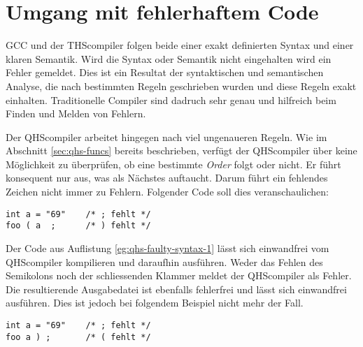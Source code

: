 \section{Umgang mit fehlerhaftem Code}
GCC und der THScompiler folgen beide einer exakt definierten Syntax und einer klaren Semantik.
Wird die Syntax oder Semantik nicht eingehalten wird ein Fehler gemeldet.
Dies ist ein Resultat der syntaktischen und semantischen Analyse, die nach bestimmten Regeln geschrieben wurden und diese Regeln exakt einhalten.
Traditionelle Compiler sind dadruch sehr genau und hilfreich beim Finden und Melden von Fehlern.

Der QHScompiler arbeitet hingegen nach viel ungenaueren Regeln.
Wie im Abschnitt \ref{sec:qhs-funcs} bereits beschrieben, verfügt der QHScompiler über keine Möglichkeit zu überprüfen, ob eine bestimmte \textit{Order} folgt oder nicht.
Er führt konsequent nur aus, was als Nächstes auftaucht. Darum führt ein fehlendes Zeichen nicht immer zu Fehlern.
Folgender Code soll dies veranschaulichen:

\begin{lstlisting}[language=QHS, caption=QHS mit fehlenden \textit{Tokens}, label=eg:qhs-faulty-syntax-1]
int a = "69"    /* ; fehlt */
foo ( a  ;      /* ) fehlt */
\end{lstlisting}

Der Code aus Auflistung \ref{eg:qhs-faulty-syntax-1} lässt sich einwandfrei vom QHScompiler kompilieren und daraufhin ausführen.
Weder das Fehlen des Semikolons noch der schliessenden Klammer meldet der QHScompiler als Fehler.
Die resultierende Ausgabedatei ist ebenfalls fehlerfrei und lässt sich einwandfrei ausführen. 
Dies ist jedoch bei folgendem Beispiel nicht mehr der Fall.

\begin{lstlisting}[language=QHS, caption=QHS mit fehlender öffnender Klammer, label=eg:qhs-faulty-syntax-2]
int a = "69"    /* ; fehlt */
foo a ) ;       /* ( fehlt */
\end{lstlisting}

